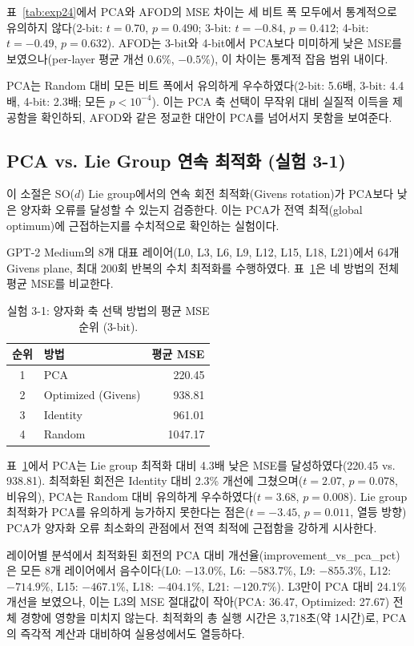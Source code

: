 \documentclass[11pt,a4paper]{article}
\begin{document}
표~\ref{tab:exp24}에서 PCA와 AFOD의 MSE 차이는 세 비트 폭 모두에서 통계적으로 유의하지 않다(2-bit: $t = 0.70$, $p = 0.490$; 3-bit: $t = -0.84$, $p = 0.412$; 4-bit: $t = -0.49$, $p = 0.632$). AFOD는 3-bit와 4-bit에서 PCA보다 미미하게 낮은 MSE를 보였으나(per-layer 평균 개선 0.6\%, $-0.5\%$), 이 차이는 통계적 잡음 범위 내이다.

PCA는 Random 대비 모든 비트 폭에서 유의하게 우수하였다(2-bit: 5.6배, 3-bit: 4.4배, 4-bit: 2.3배; 모든 $p < 10^{-4}$). 이는 PCA 축 선택이 무작위 대비 실질적 이득을 제공함을 확인하되, AFOD와 같은 정교한 대안이 PCA를 넘어서지 못함을 보여준다.

\subsection{PCA vs. Lie Group 연속 최적화 (실험 3-1)}

이 소절은 SO($d$) Lie group에서의 연속 회전 최적화(Givens rotation)가 PCA보다 낮은 양자화 오류를 달성할 수 있는지 검증한다. 이는 PCA가 전역 최적(global optimum)에 근접하는지를 수치적으로 확인하는 실험이다.

GPT-2 Medium의 8개 대표 레이어(L0, L3, L6, L9, L12, L15, L18, L21)에서 64개 Givens plane, 최대 200회 반복의 수치 최적화를 수행하였다. 표~\ref{tab:exp31}은 네 방법의 전체 평균 MSE를 비교한다.

\begin{table}[H]
\centering
\caption{실험 3-1: 양자화 축 선택 방법의 평균 MSE 순위 (3-bit).}
\label{tab:exp31}
\small
\begin{tabular}{clr}
\toprule
\textbf{순위} & \textbf{방법} & \textbf{평균 MSE} \\
\midrule
1 & PCA & 220.45 \\
2 & Optimized (Givens) & 938.81 \\
3 & Identity & 961.01 \\
4 & Random & 1047.17 \\
\bottomrule
\end{tabular}
\end{table}

표~\ref{tab:exp31}에서 PCA는 Lie group 최적화 대비 4.3배 낮은 MSE를 달성하였다(220.45 vs. 938.81). 최적화된 회전은 Identity 대비 2.3\% 개선에 그쳤으며($t = 2.07$, $p = 0.078$, 비유의), PCA는 Random 대비 유의하게 우수하였다($t = 3.68$, $p = 0.008$). Lie group 최적화가 PCA를 유의하게 능가하지 못한다는 점은($t = -3.45$, $p = 0.011$, 열등 방향) PCA가 양자화 오류 최소화의 관점에서 전역 최적에 근접함을 강하게 시사한다.

레이어별 분석에서 최적화된 회전의 PCA 대비 개선율(improvement\_vs\_pca\_pct)은 모든 8개 레이어에서 음수이다(L0: $-13.0\%$, L6: $-583.7\%$, L9: $-855.3\%$, L12: $-714.9\%$, L15: $-467.1\%$, L18: $-404.1\%$, L21: $-120.7\%$). L3만이 PCA 대비 24.1\% 개선을 보였으나, 이는 L3의 MSE 절대값이 작아(PCA: 36.47, Optimized: 27.67) 전체 경향에 영향을 미치지 않는다. 최적화의 총 실행 시간은 3,718초(약 1시간)로, PCA의 즉각적 계산과 대비하여 실용성에서도 열등하다.
\end{document}

